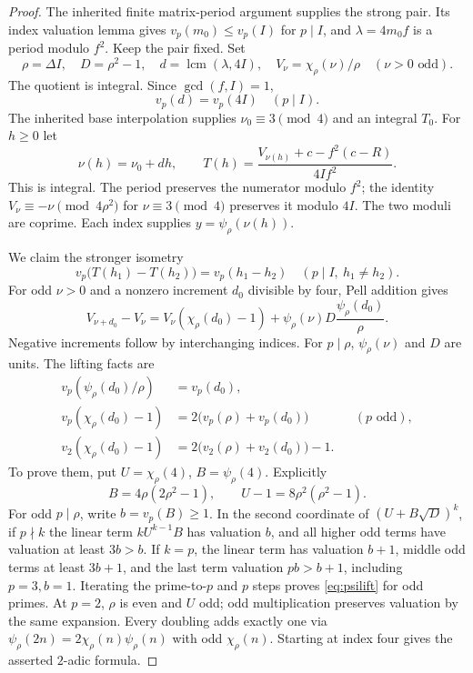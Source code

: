 \begin{proof}
The inherited finite matrix-period argument supplies the strong pair. Its index valuation lemma gives $v_p(m_0)\le v_p(I)$ for $p\mid I$, and $\lambda=4m_0f$ is a period modulo $f^2$. Keep the pair fixed. Set
\[
 \rho=\Delta I,\quad D=\rho^2-1,\quad
 d=\operatorname{lcm}(\lambda,4I),\quad V_\nu=\chi_\rho(\nu)/\rho
 \quad(\nu>0\text{ odd}).
\]
The quotient is integral. Since $\gcd(f,I)=1$,
\begin{equation}\label{eq:dvaluation}v_p(d)=v_p(4I)\quad(p\mid I).\end{equation}
The inherited base interpolation supplies $\nu_0\equiv3\pmod4$ and an integral $T_0$. For $h\ge0$ let
\[
 \nu(h)=\nu_0+dh,\qquad T(h)=\frac{V_{\nu(h)}+c-f^2(c-R)}{4If^2}.
\]
This is integral. The period preserves the numerator modulo $f^2$; the identity $V_\nu\equiv-\nu\pmod{4\rho^2}$ for $\nu\equiv3\pmod4$ preserves it modulo $4I$. The two moduli are coprime. Each index supplies $y=\psi_\rho(\nu(h))$.

We claim the stronger isometry
\begin{equation}\label{eq:isometry}
 v_p\bigl(T(h_1)-T(h_2)\bigr)=v_p(h_1-h_2)\quad(p\mid I,\ h_1\ne h_2).
\end{equation}
For odd $\nu>0$ and a nonzero increment $d_0$ divisible by four, Pell addition gives
\begin{equation}\label{eq:addition}
 V_{\nu+d_0}-V_\nu
 =V_\nu(\chi_\rho(d_0)-1)
 +\psi_\rho(\nu)D\frac{\psi_\rho(d_0)}\rho.
\end{equation}
Negative increments follow by interchanging indices. For $p\mid\rho$, $\psi_\rho(\nu)$ and $D$ are units. The lifting facts are
\begin{align}
 v_p(\psi_\rho(d_0)/\rho)&=v_p(d_0),\label{eq:psilift}\\
 v_p(\chi_\rho(d_0)-1)&=2\bigl(v_p(\rho)+v_p(d_0)\bigr)&& (p\text{ odd}),\\
 v_2(\chi_\rho(d_0)-1)&=2\bigl(v_2(\rho)+v_2(d_0)\bigr)-1.
\end{align}
To prove them, put $U=\chi_\rho(4)$, $B=\psi_\rho(4)$. Explicitly
\[
 B=4\rho(2\rho^2-1),\qquad U-1=8\rho^2(\rho^2-1).
\]
For odd $p\mid\rho$, write $b=v_p(B)\ge1$. In the second coordinate of $(U+B\sqrt D)^k$, if $p\nmid k$ the linear term $kU^{k-1}B$ has valuation $b$, and all higher odd terms have valuation at least $3b>b$. If $k=p$, the linear term has valuation $b+1$, middle odd terms at least $3b+1$, and the last term valuation $pb>b+1$, including $p=3,b=1$. Iterating the prime-to-$p$ and $p$ steps proves \eqref{eq:psilift} for odd primes. At $p=2$, $\rho$ is even and $U$ odd; odd multiplication preserves valuation by the same expansion. Every doubling adds exactly one via $\psi_\rho(2n)=2\chi_\rho(n)\psi_\rho(n)$ with odd $\chi_\rho(n)$. Starting at index four gives the asserted $2$-adic formula.


\end{proof}
